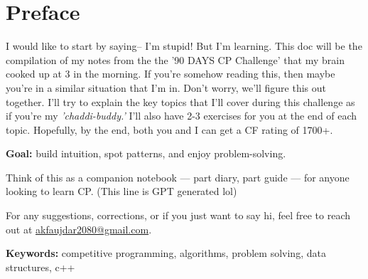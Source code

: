 \chapter*{Preface}

I would like to start by saying-- I'm stupid! But I'm learning. This doc will be the compilation of my notes from the the '90 DAYS CP Challenge' that my brain cooked up at 3 in the morning. If you're somehow reading this, then maybe you're in a similar situation that I'm in. Don't worry, we'll figure this out together. I'll try to explain the key topics that I'll cover during this challenge as if you're my \textit{'chaddi-buddy.'} I'll also have 2-3 exercises for you at the end of each topic. Hopefully, by the end, both you and I can get a CF rating of 1700+.

\textbf{Goal:} build intuition, spot patterns, and enjoy problem-solving.

Think of this as a companion notebook — part diary, part guide — for anyone looking to learn CP. (This line is GPT generated lol)

\vspace{1em}


For any suggestions, corrections, or if you just want to say hi, feel free to reach out at \href{mailto:akfaujdar2080@gmail.com}{akfaujdar2080@gmail.com}.

\vspace{1 em}
\noindent\textbf{Keywords:} competitive programming, algorithms, problem solving, data structures, c++